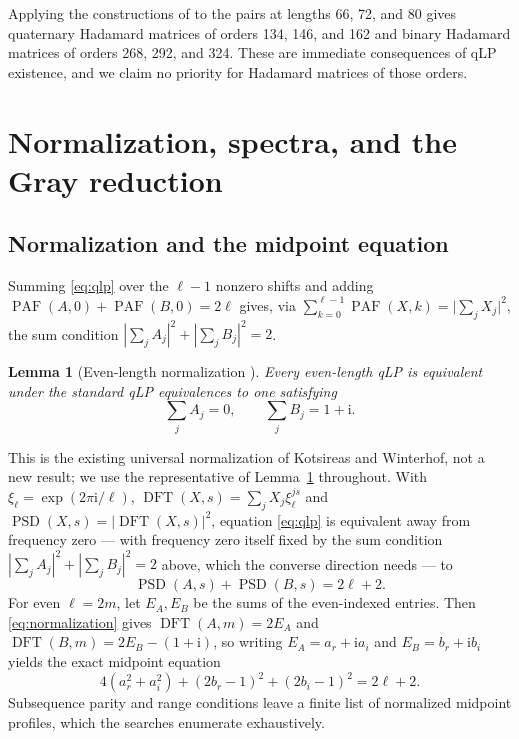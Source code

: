 \documentclass[11pt]{article}
\newtheorem{lemma}[theorem]{Lemma}
\newcommand{\PAF}{\operatorname{PAF}}
\newcommand{\PSD}{\operatorname{PSD}}
\newcommand{\DFT}{\operatorname{DFT}}
\newcommand{\ii}{\mathrm{i}}
\begin{document}
Applying the constructions of \cite{kotsireas-winterhof-2024} to the pairs at
lengths 66, 72, and 80 gives quaternary Hadamard matrices of orders 134, 146,
and 162 and binary Hadamard matrices of orders 268, 292, and 324.  These are
immediate consequences of qLP existence, and we claim no priority for
Hadamard matrices of those orders.

\section{Normalization, spectra, and the Gray reduction}
\label{sec:reduction}

\subsection*{Normalization and the midpoint equation}

Summing \eqref{eq:qlp} over the $\ell-1$ nonzero shifts and adding
$\PAF(A,0)+\PAF(B,0)=2\ell$ gives, via
$\sum_{k=0}^{\ell-1}\PAF(X,k)=\bigl|\sum_j X_j\bigr|^2$,
the sum condition $|\sum_j A_j|^2+|\sum_j B_j|^2=2$.

\begin{lemma}[Even-length normalization {\cite[Lemma~2.1]{kotsireas-winterhof-2024}}]
\label{lem:even-normalization}
Every even-length qLP is equivalent under the standard qLP equivalences to one
satisfying
\begin{equation}
  \sum_j A_j=0,\qquad \sum_j B_j=1+\ii.
  \label{eq:normalization}
\end{equation}
\end{lemma}

This is the existing universal normalization of Kotsireas and Winterhof, not a
new result; we use the representative of
Lemma~\ref{lem:even-normalization} throughout.  With
$\xi_\ell=\exp(2\pi\ii/\ell)$, $\DFT(X,s)=\sum_j X_j\xi_\ell^{js}$ and
$\PSD(X,s)=|\DFT(X,s)|^2$, equation \eqref{eq:qlp} is equivalent away from
frequency zero --- with frequency zero itself fixed by the sum condition
$|\sum_j A_j|^2+|\sum_j B_j|^2=2$ above, which the converse direction needs
--- to
\begin{equation}
  \PSD(A,s)+\PSD(B,s)=2\ell+2.
  \label{eq:psd-total}
\end{equation}
For even $\ell=2m$, let $E_A,E_B$ be the sums of the even-indexed entries.
Then \eqref{eq:normalization} gives $\DFT(A,m)=2E_A$ and
$\DFT(B,m)=2E_B-(1+\ii)$, so writing $E_A=a_r+\ii a_i$ and $E_B=b_r+\ii b_i$
yields the exact midpoint equation
\begin{equation}
  4(a_r^2+a_i^2)+(2b_r-1)^2+(2b_i-1)^2=2\ell+2.
  \label{eq:midpoint}
\end{equation}
Subsequence parity and range conditions leave a finite list of normalized
midpoint profiles, which the searches enumerate exhaustively.
\end{document}
